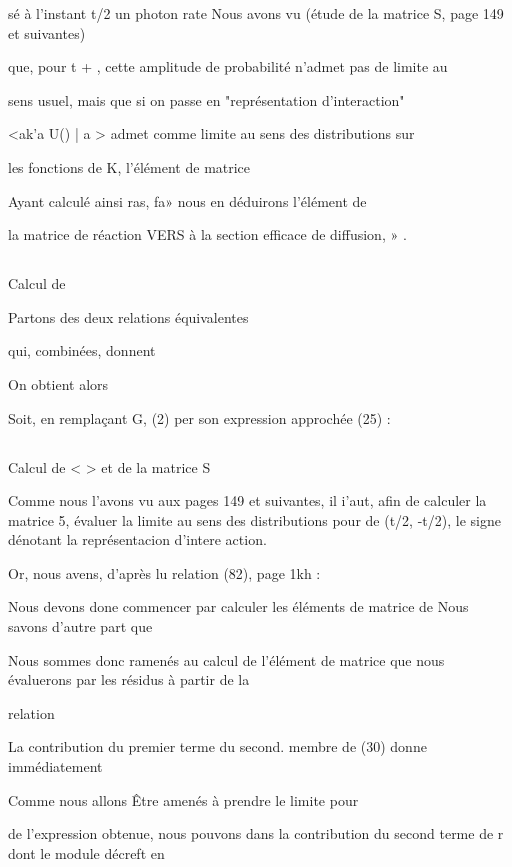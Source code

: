 sé à l'instant t/2 un photon rate
Nous avons vu (étude de la matrice S, page 149 et suivantes)

que, pour t + , cette amplitude de probabilité n'admet pas de limite au

sens usuel, mais que si on passe en "représentation d'interaction"

<ak'a U() | a > admet comme limite au sens des distributions sur

les fonctions de K, l'élément de matrice 

Ayant calculé ainsi ras, fa» nous en déduirons l'élément de

la matrice de réaction VERS à  la section efficace de diffusion,
» .

\subsection{} Calcul de %

Partons des deux relations équivalentes

qui, combinées, donnent

On obtient alors

Soit, en remplaçant G, (2) per son expression approchée (25) :

\subsection{} Calcul de <  > et de la matrice S%

Comme nous l'avons vu aux pages 149 et suivantes, il i'aut,
afin de calculer la matrice 5, évaluer la limite au sens des distributions
pour  de  (t/2, -t/2), le signe  dénotant la représentacion d'intere
action.

Or, nous avens, d'après lu relation (82), page 1kh :

Nous devons done commencer par calculer les éléments de matrice de
Nous savons d'autre part que 

Nous sommes donc ramenés au calcul de l'élément de matrice
 que nous évaluerons par les résidus à partir de la

relation

La contribution du premier terme du second. membre de (30) donne immédiatement

Comme nous allons Être amenés à prendre le limite pour 

de l'expression obtenue, nous pouvons dans la contribution du second terme de
r
dont le module décreft en



